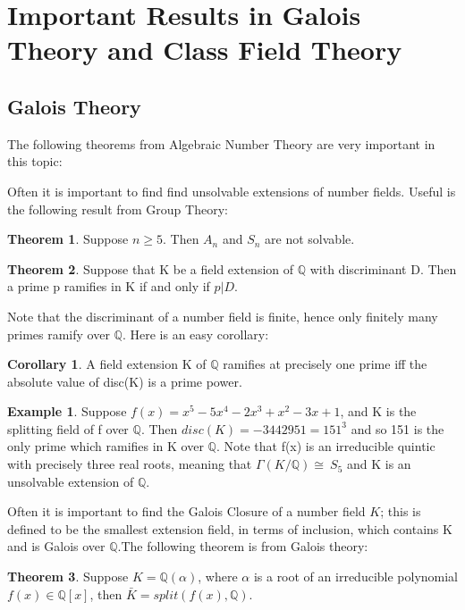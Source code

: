 \documentclass[12pt]{extarticle}
\newcommand{\Q}{\mathbb{Q}}
\newcommand{\GG}{\Gamma(K/\mathbb{Q})}
\newcommand{\spl}{split(f(x),\mathbb{Q})}
\newcommand{\<}{\langle}
\renewcommand{\>}{\rangle}
\theoremstyle{definition}
\newtheorem{theorem}{Theorem}
\newtheorem{corollary}{Corollary}
\newtheorem*{example}{Example}
\begin{document}
\section{Important Results in Galois Theory and Class Field Theory}
\subsection{Galois Theory}
The following theorems from Algebraic Number Theory are very important in this topic:

Often it is important to find find unsolvable extensions of number fields. Useful is the following result from Group Theory:
\begin{theorem}
Suppose $n \geq 5$. Then $A_n$ and $S_n$ are not solvable. 
\end{theorem}
\begin{theorem}
 Suppose that K be a field extension of $\Q$ with discriminant D. Then a prime p
ramifies in K if and only if $p|D$.   
\end{theorem}
Note that the discriminant of a number field is finite, hence only finitely many primes ramify over $\Q$. Here is an easy corollary:
\begin{corollary}
A field extension K of $\Q$ ramifies at precisely one prime iff the absolute value of disc(K) is a prime power.
\end{corollary}
\begin{example}
    Suppose $f(x)=x^5-5x^4-2x^3+x^2-3x+1$, and K is the splitting field of f over $\Q$. Then $disc(K)=-3442951=151^3$ and so 151 is the only prime which ramifies in K over $\Q$. Note that f(x) is an irreducible quintic with precisely three real roots, meaning that $\GG \cong\ S_5$ and K is an unsolvable extension of $\Q$.
\end{example}

Often it is important to find the Galois Closure of a number field $K$;  this is defined to be the smallest extension field, in terms of inclusion, which contains K and is Galois over $\Q$.The following theorem is  from Galois theory: \begin{theorem}
  Suppose $K=\Q(\alpha)$, where $\alpha$ is a root of an irreducible polynomial $f(x) \in \Q[x]$, then $\bar{K} = \spl$.
\end{theorem}
\end{document}
